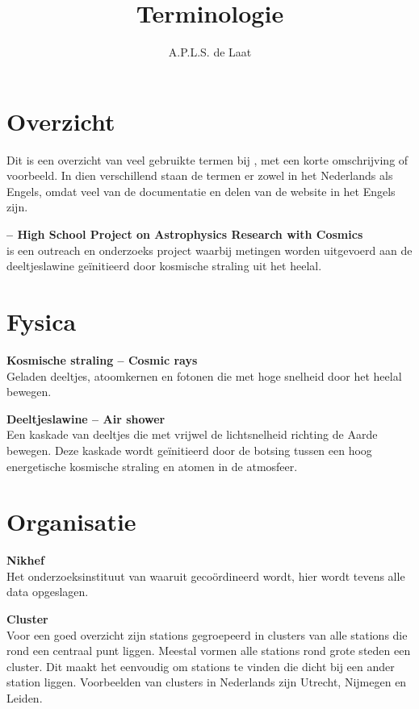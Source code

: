 

\title{Terminologie}
\author{A.P.L.S. de Laat}



\maketitle

\section{Overzicht}

Dit is een overzicht van veel gebruikte termen bij \hisparc, met een
korte omschrijving of voorbeeld. In dien verschillend staan de termen er
zowel in het Nederlands als Engels, omdat veel van de documentatie en
delen van de website in het Engels zijn.


\textbf{\hisparc -- High School Project on Astrophysics Research with Cosmics} \\
\hisparc is een outreach en onderzoeks project waarbij metingen worden
uitgevoerd aan de deeltjeslawine geïnitieerd door kosmische straling uit
het heelal.


\section{Fysica}

\textbf{Kosmische straling -- Cosmic rays} \\
Geladen deeltjes, atoomkernen en fotonen die met hoge snelheid door
het heelal bewegen.

\textbf{Deeltjeslawine -- Air shower} \\
Een kaskade van deeltjes die met vrijwel de lichtsnelheid richting de
Aarde bewegen. Deze kaskade wordt geïnitieerd door de botsing tussen een
hoog energetische kosmische straling en atomen in de atmosfeer.


\section{Organisatie}

\textbf{Nikhef} \\
Het onderzoeksinstituut van waaruit \hisparc gecoördineerd wordt, hier
wordt tevens alle data opgeslagen.

\textbf{Cluster} \\
Voor een goed overzicht zijn stations gegroepeerd in clusters van alle
stations die rond een centraal punt liggen. Meestal vormen alle stations
rond grote steden een cluster. Dit maakt het eenvoudig om stations te
vinden die dicht bij een ander station liggen. Voorbeelden van clusters
in Nederlands zijn Utrecht, Nijmegen en Leiden.

